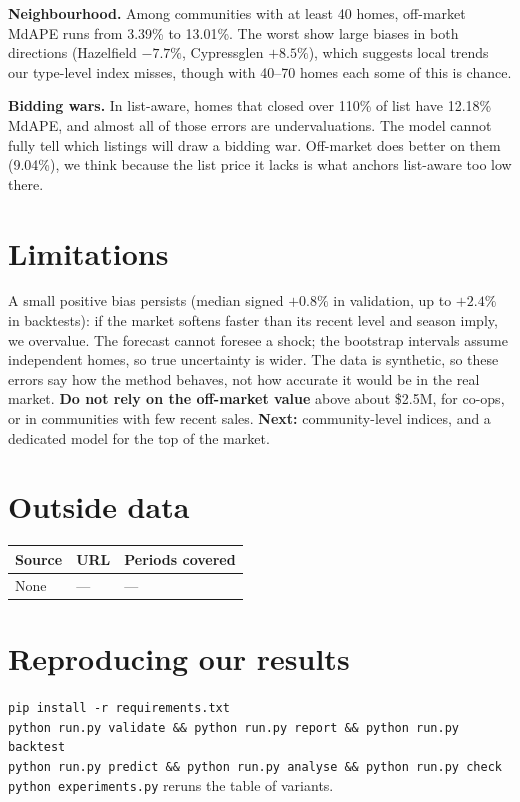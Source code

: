 \documentclass[11pt]{article}
\begin{document}
\textbf{Neighbourhood.} Among communities with at least 40 homes, off-market MdAPE runs from 3.39\% to 13.01\%. The worst show large biases in both directions (Hazelfield $-7.7\%$, Cypressglen $+8.5\%$), which suggests local trends our type-level index misses, though with 40--70 homes each some of this is chance.

\textbf{Bidding wars.} In list-aware, homes that closed over 110\% of list have 12.18\% MdAPE, and almost all of those errors are undervaluations. The model cannot fully tell which listings will draw a bidding war. Off-market does better on them (9.04\%), we think because the list price it lacks is what anchors list-aware too low there.

\section{Limitations}
A small positive bias persists (median signed $+0.8\%$ in validation, up to $+2.4\%$ in backtests): if the market softens faster than its recent level and season imply, we overvalue. The forecast cannot foresee a shock; the bootstrap intervals assume independent homes, so true uncertainty is wider. The data is synthetic, so these errors say how the method behaves, not how accurate it would be in the real market. \textbf{Do not rely on the off-market value} above about \$2.5M, for co-ops, or in communities with few recent sales. \textbf{Next:} community-level indices, and a dedicated model for the top of the market.

\section*{Outside data}
\begin{tabular}{lll}
\toprule
Source & URL & Periods covered \\
\midrule
None & --- & --- \\
\bottomrule
\end{tabular}

\section*{Reproducing our results}
\texttt{pip install -r requirements.txt}\\
\texttt{python run.py validate \&\& python run.py report \&\& python run.py backtest}\\
\texttt{python run.py predict \&\& python run.py analyse \&\& python run.py check}\\
\texttt{python experiments.py} reruns the table of variants.
\end{document}
